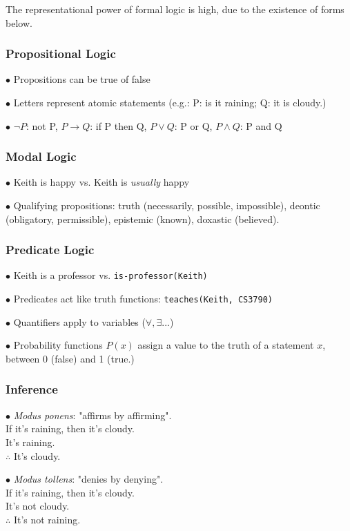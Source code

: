 \documentclass[english,openany]{book}
\begin{document}
The representational power of formal logic is high, due to the existence of forms below.

\subsubsection{Propositional Logic}

$\bullet$ Propositions can be true of false

$\bullet$ Letters represent atomic statements (e.g.: P: is it raining; Q: it is cloudy.)

$\bullet$ $\neg P$: not P, $P \rightarrow Q$: if P then Q, $P \lor Q$: P or Q, $P \wedge Q$: P and Q

\subsubsection{Modal Logic}

$\bullet$ Keith is happy vs. Keith is \textit{usually} happy

$\bullet$ Qualifying propositions: truth (necessarily, possible, impossible), deontic (obligatory, permissible), epistemic (known), doxastic (believed).

\subsubsection{Predicate Logic}

$\bullet$ Keith is a professor vs. \texttt{is-professor(Keith)}

$\bullet$ Predicates act like truth functions: \texttt{teaches(Keith, CS3790)}

$\bullet$ Quantifiers apply to variables ($\forall, \exists...$)

$\bullet$ Probability functions $P(x)$ assign a value to the truth of a statement $x$, between 0 (false) and 1 (true.)

\subsubsection{Inference}


$\bullet$ \textit{Modus ponens}: "affirms by affirming". 
\\If it's raining, then it's cloudy.\\ It's raining.\\ $\therefore$ It's cloudy.

$\bullet$ \textit{Modus tollens}: "denies by denying".
\\If it's raining, then it's cloudy.\\ It's not cloudy.\\ $\therefore$ It's not raining.
\end{document}

